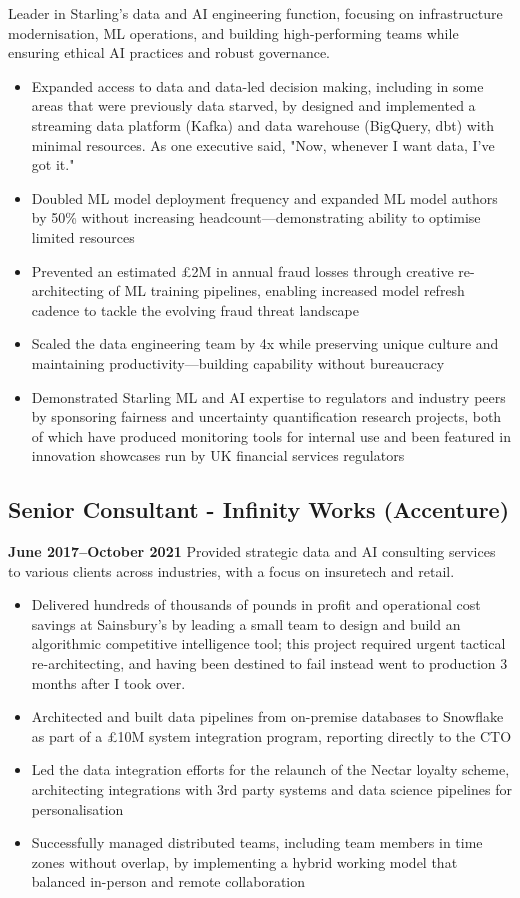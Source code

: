 \documentclass[a4paper]{scrartcl}
\begin{document}
Leader in Starling's data and AI engineering function, focusing on infrastructure modernisation, ML operations, and building high-performing teams while ensuring ethical AI practices and robust governance.
\begin{itemize}
	\item Expanded access to data and data-led decision making, including in some areas that were previously data starved, by designed and implemented a streaming data platform (Kafka) and data warehouse (BigQuery, dbt) with minimal resources. As one executive said, "Now, whenever I want data, I've got it."
	\item Doubled ML model deployment frequency and expanded ML model authors by 50\% without increasing headcount—demonstrating ability to optimise limited resources
	\item Prevented an estimated £2M in annual fraud losses through creative re-architecting of ML training pipelines, enabling increased model refresh cadence to tackle the evolving fraud threat landscape
	\item Scaled the data engineering team by 4x while preserving unique culture and maintaining productivity—building capability without bureaucracy
	\item Demonstrated Starling ML and AI expertise to regulators and industry peers by sponsoring fairness and uncertainty quantification research projects, both of which have produced monitoring tools for internal use and been featured in innovation showcases run by UK financial services regulators
\end{itemize}

\subsection*{Senior Consultant - Infinity Works (Accenture)}
\textbf{June 2017--October 2021}
Provided strategic data and AI consulting services to various clients across industries, with a focus on insuretech and retail.
\begin{itemize}
	\item Delivered hundreds of thousands of pounds in profit and operational cost savings at Sainsbury's by leading a small team to design and build an algorithmic competitive intelligence tool; this project required urgent tactical re-architecting, and having been destined to fail instead went to production 3 months after I took over.
	\item Architected and built data pipelines from on-premise databases to Snowflake as part of a £10M system integration program, reporting directly to the CTO
	\item Led the data integration efforts for the relaunch of the Nectar loyalty scheme, architecting integrations with 3rd party systems and data science pipelines for personalisation
	\item Successfully managed distributed teams, including team members in time zones without overlap, by implementing a hybrid working model that balanced in-person and remote collaboration
\end{itemize}
\end{document}
